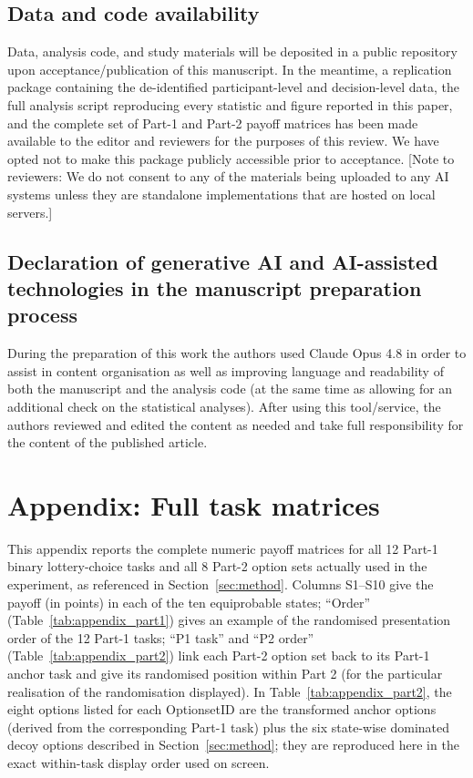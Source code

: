 \documentclass[a4paper, 12pt, fleqn]{article}
\theoremstyle{hypstyle}
\newcommand{\inew}[1]{{\color{blue} #1\color{black}}}
\begin{document}
\subsection{Data and code availability}
Data, analysis code, and study materials will be deposited in a public repository upon acceptance/publication of this manuscript. In the meantime, a replication package containing the de-identified participant-level and decision-level data, the full analysis script reproducing every statistic and figure reported in this paper, and the complete set of Part-1 and Part-2 payoff matrices has been made available to the editor and reviewers for the purposes of this review. We have opted not to make this package publicly accessible prior to acceptance. \inew{[Note to reviewers: We do not consent to any of the materials being uploaded to any AI systems unless they are standalone implementations that are hosted on local servers.]}


\subsection{Declaration of generative AI and AI-assisted technologies in the manuscript preparation process}
During the preparation of this work the authors used Claude Opus 4.8 in order to assist in content organisation as well as improving language and readability of both the manuscript and the analysis code (at the same time as allowing for an additional check on the statistical analyses). After using this tool/service, the authors reviewed and edited the content as needed and take full responsibility for the content of the published article.


\newpage
\thispagestyle{plain}
\addtolength{\topmargin}{-.5cm}
\addtolength{\textheight}{.8cm}



\clearpage
\appendix

\section{Appendix: Full task matrices}
\label{sec:appendix_tasks}
This appendix reports the complete numeric payoff matrices for all 12 Part-1 binary lottery-choice tasks and all 8 Part-2 option sets actually used in the experiment, as referenced in Section~\ref{sec:method}. Columns S1--S10 give the payoff (in points) in each of the ten equiprobable states; ``Order'' (Table~\ref{tab:appendix_part1}) gives an example of the randomised presentation order of the 12 Part-1 tasks; ``P1 task'' and ``P2 order'' (Table~\ref{tab:appendix_part2}) link each Part-2 option set back to its Part-1 anchor task and give its randomised position within Part 2 (for the particular realisation of the randomisation displayed). In Table~\ref{tab:appendix_part2}, the eight options listed for each OptionsetID are the transformed anchor options (derived from the corresponding Part-1 task) plus the six state-wise dominated decoy options described in Section~\ref{sec:method}; they are reproduced here in the exact within-task display order used on screen.
\end{document}
